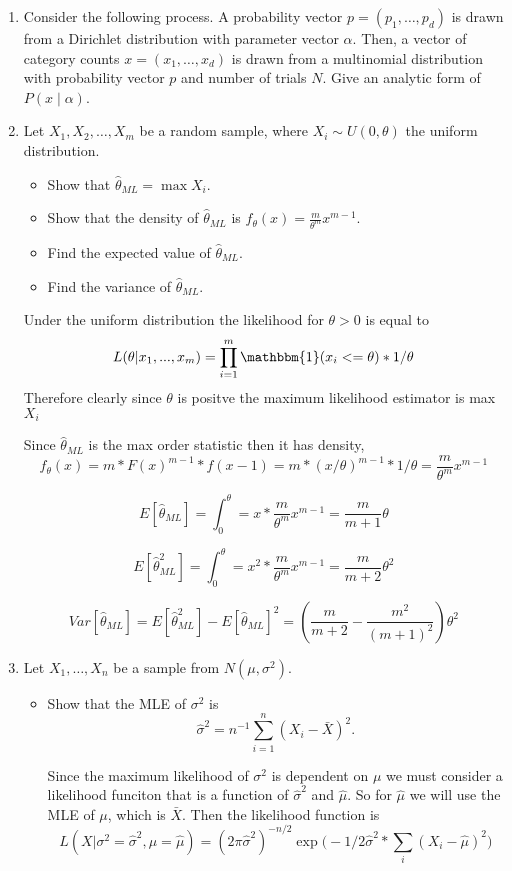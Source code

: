 \documentclass{article}
\begin{document}
\begin{enumerate}
\item
Consider the following process.  A probability vector $p=(p_1, \ldots, p_d)$ is drawn from a Dirichlet distribution with parameter vector $\alpha$.
Then, a vector of category counts $x=(x_1, \ldots, x_d)$ is drawn from a multinomial distribution with probability vector $p$ and number of trials $N$. Give an analytic form of $P(x \mid \alpha)$.  

\item
Let $X_1, X_2, \ldots, X_m$ be a random sample, where $X_i \sim U(0,\theta)$ the uniform distribution.
\begin{itemize}
\item Show that $\hat\theta_{ML} = \max X_i$.
\item Show that the density of $\hat\theta_{ML}$ is $f_\theta(x) = \frac{m}{\theta^m} x^{m-1}$.
\item Find the expected value of $\hat\theta_{ML}$.
\item Find the variance of $\hat\theta_{ML}$.
\end{itemize}

\color{blue}
Under the uniform distribution the likelihood for $\theta > 0$ is equal to
$$
L(\theta | x_1, ...,x_m) = \prod_{i = 1}^m \mathbbm{1}(x_i <= \theta) * 1/\theta 
$$
Therefore clearly since $\theta$ is positve the maximum likelihood estimator is max$X_i$

Since $\hat{\theta}_{ML}$ is the max order statistic then it has density,
\[
f_\theta(x) = m * F(x)^{m-1} * f(x-1) = m * (x/\theta)^{m-1} * 1/\theta = \frac{m}{\theta^m}x^{m-1}
\]

\[
E[\hat{\theta}_{ML}] = \int_0^\theta = x * \frac{m}{\theta^m}x^{m-1} = \frac{m}{m+1} \theta
\]

\[
E[\hat{\theta}_{ML}^2] = \int_0^\theta = x^2 * \frac{m}{\theta^m}x^{m-1} = \frac{m}{m+2} \theta ^2
\]

\[
Var[\hat\theta_{ML}] = E[\hat{\theta}_{ML}^2] - E[\hat{\theta}_{ML}]^2 = (\frac{m}{m+2} - \frac{m^2}{(m+1)^2}) \theta^2
\]

\color{black}

\item
Let $X_1, \ldots, X_n$ be a sample from $N(\mu, \sigma^2)$.
\begin{itemize}
\item Show that the MLE of $\sigma^2$ is
$${\hat\sigma}^2 = n^{-1} \sum_{i=1}^n (X_i - \bar X)^2.$$

\color{blue}
Since the maximum likelihood of $\sigma^2$ is dependent on $\mu$ we must consider a likelihood funciton that is a function of $\hat{\sigma}^2$ and $\hat{\mu}$. So for $\hat{\mu}$ we will use the MLE of $\mu$, which is $\bar{X}$. 
Then the likelihood function is 
$$
L(X | \sigma^2 = \hat{\sigma}^2, \mu = \hat{\mu}) = (2\pi \hat \sigma^2)^{-n/2} \exp\big(-1/2\hat \sigma^2 * \sum_i (X_i - \hat{\mu})^2 \big)
$$ 


\end{itemize}
\end{enumerate}
\end{document}
